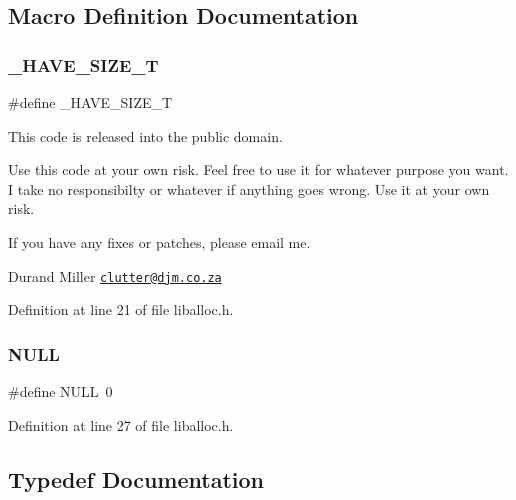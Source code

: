 \subsection{Macro Definition Documentation}
\mbox{\label{a00038_a40684528083f4cc0dfe3ca1accae3f79_a40684528083f4cc0dfe3ca1accae3f79}} 
\subsubsection{\texorpdfstring{\+\_\+\+H\+A\+V\+E\+\_\+\+S\+I\+Z\+E\+\_\+T}{\_HAVE\_SIZE\_T}}
{\footnotesize\ttfamily \#define \+\_\+\+H\+A\+V\+E\+\_\+\+S\+I\+Z\+E\+\_\+T}



This code is released into the public domain. 

Use this code at your own risk. Feel free to use it for whatever purpose you want. I take no responsibilty or whatever if anything goes wrong. Use it at your own risk.

If you have any fixes or patches, please email me.

Durand Miller \href{mailto:clutter@djm.co.za}{\tt clutter@djm.\+co.\+za} 

Definition at line 21 of file liballoc.\+h.

\mbox{\label{a00038_a070d2ce7b6bb7e5c05602aa8c308d0c4_a070d2ce7b6bb7e5c05602aa8c308d0c4}} 
\subsubsection{\texorpdfstring{N\+U\+LL}{NULL}}
{\footnotesize\ttfamily \#define N\+U\+LL~0}



Definition at line 27 of file liballoc.\+h.



\subsection{Typedef Documentation}
\mbox{\label{a00038_a7c94ea6f8948649f8d181ae55911eeaf_a7c94ea6f8948649f8d181ae55911eeaf}} 
